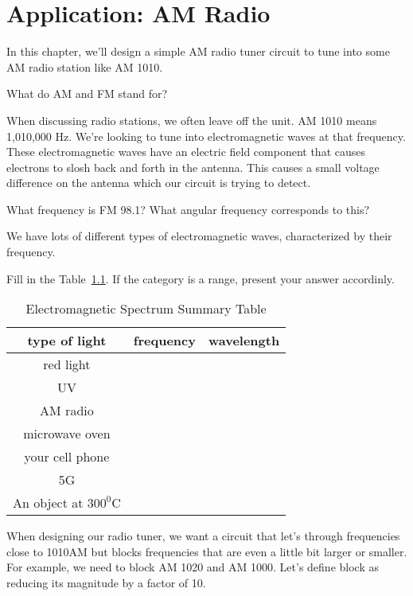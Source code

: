 \chapter{Application: AM Radio}
In this chapter, we'll design a simple AM radio tuner circuit to tune into some AM radio station like AM 1010.

\begin{alevel}
What do AM and FM stand for?
\end{alevel}

When discussing radio stations, we often leave off the unit. AM 1010 means 1,010,000 Hz. We're looking to tune into electromagnetic waves at that frequency. These electromagnetic waves have an electric field component that causes electrons to slosh back and forth in the antenna. This causes a small voltage difference on the antenna which our circuit is trying to detect.

\begin{alevel}
What frequency is FM 98.1? What angular frequency corresponds to this?
\end{alevel}

We have lots of different types of electromagnetic waves, characterized by their frequency. 

\begin{blevel}
Fill in the Table~\ref{T:9L}. If the category is a range, present your answer accordinly.
\end{blevel}

\begin{table}[H]
\begin{center}
\begin{tabular}{c|c|c}
type of light&frequency&wavelength\\ \hline
red light&& \\ \hline
UV&& \\ \hline
AM radio&& \\ \hline
microwave oven&& \\ \hline
your cell phone&& \\ \hline
5G&& \\ \hline
An object at $300^0$C&& \\ \hline
\end{tabular}
\caption{Electromagnetic Spectrum Summary Table}
\label{T:9L}
\end{center}
\end{table}

When designing our radio tuner, we want a circuit that let's through frequencies close to 1010AM but blocks frequencies that are even a little bit larger or smaller. For example, we need to block AM 1020 and AM 1000. Let's define block as reducing its magnitude by a factor of 10.\par

